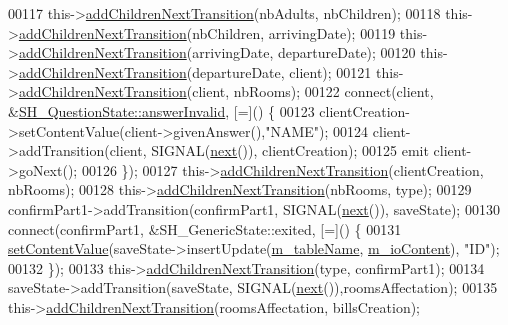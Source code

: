 \begin{DoxyCode}
00117     this->\hyperlink{classSimpleHotel_1_1SH__InOutStateMachine_aaf5afe04d6e4d3d5ebf0b5f1b00eddf1}{addChildrenNextTransition}(nbAdults, nbChildren);
00118     this->\hyperlink{classSimpleHotel_1_1SH__InOutStateMachine_aaf5afe04d6e4d3d5ebf0b5f1b00eddf1}{addChildrenNextTransition}(nbChildren, arrivingDate);
00119     this->\hyperlink{classSimpleHotel_1_1SH__InOutStateMachine_aaf5afe04d6e4d3d5ebf0b5f1b00eddf1}{addChildrenNextTransition}(arrivingDate, departureDate);
00120     this->\hyperlink{classSimpleHotel_1_1SH__InOutStateMachine_aaf5afe04d6e4d3d5ebf0b5f1b00eddf1}{addChildrenNextTransition}(departureDate, client);
00121     this->\hyperlink{classSimpleHotel_1_1SH__InOutStateMachine_aaf5afe04d6e4d3d5ebf0b5f1b00eddf1}{addChildrenNextTransition}(client, nbRooms);
00122     connect(client, &\hyperlink{classSimpleHotel_1_1SH__QuestionState_a69caaa66c68de820a5afa9584f24ca31}{SH\_QuestionState::answerInvalid}, [=]() \{
00123         clientCreation->setContentValue(client->givenAnswer(),\textcolor{stringliteral}{"NAME"});
00124         client->addTransition(client, SIGNAL(\hyperlink{classSimpleHotel_1_1SH__GenericStateMachine_a2de14d4920ae8c10b70c2d73fc2d4a93}{next}()), clientCreation);
00125         emit client->goNext();
00126     \});
00127     this->\hyperlink{classSimpleHotel_1_1SH__InOutStateMachine_aaf5afe04d6e4d3d5ebf0b5f1b00eddf1}{addChildrenNextTransition}(clientCreation, nbRooms);
00128     this->\hyperlink{classSimpleHotel_1_1SH__InOutStateMachine_aaf5afe04d6e4d3d5ebf0b5f1b00eddf1}{addChildrenNextTransition}(nbRooms, type);
00129     confirmPart1->addTransition(confirmPart1, SIGNAL(\hyperlink{classSimpleHotel_1_1SH__GenericStateMachine_a2de14d4920ae8c10b70c2d73fc2d4a93}{next}()), saveState);
00130     connect(confirmPart1, &SH\_GenericState::exited, [=]() \{
00131         \hyperlink{classSimpleHotel_1_1SH__InOutStateMachine_aaf92da452f6cf7cc57aa9e60f88322e4}{setContentValue}(saveState->insertUpdate(\hyperlink{classSimpleHotel_1_1SH__InOutStateMachine_a15c063debdaa4c87bd4925867a13ce9e}{m\_tableName}, 
      \hyperlink{classSimpleHotel_1_1SH__InOutStateMachine_a4b0a3a48b0da31fddb724a357ad9b52c}{m\_ioContent}), \textcolor{stringliteral}{"ID"});
00132     \});
00133     this->\hyperlink{classSimpleHotel_1_1SH__InOutStateMachine_aaf5afe04d6e4d3d5ebf0b5f1b00eddf1}{addChildrenNextTransition}(type, confirmPart1);
00134     saveState->addTransition(saveState, SIGNAL(\hyperlink{classSimpleHotel_1_1SH__GenericStateMachine_a2de14d4920ae8c10b70c2d73fc2d4a93}{next}()),roomsAffectation);
00135     this->\hyperlink{classSimpleHotel_1_1SH__InOutStateMachine_aaf5afe04d6e4d3d5ebf0b5f1b00eddf1}{addChildrenNextTransition}(roomsAffectation, billsCreation);

\end{DoxyCode}
